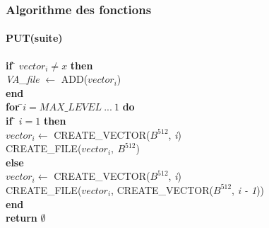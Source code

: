 \documentclass[hyperref={pdfpagemode=FullScreen,colorlinks=true},xcolor=pst,dvips]{beamer}\usepackage[french]{babel}
\begin{document}
	\begin{frame}[shrink]
		\frametitle{Algorithme des fonctions}
		\framesubtitle{PUT(suite)}
		\begin{framed}
		\begin{tabbing}
			\textbf{if }\= $vector_i \neq x$\textbf{ then}\\
				\> \textit{VA\_file } $\leftarrow$ ADD($vector_i$)\\
			\textbf{end}	\\	

			\textbf{for }\=$i = MAX\_LEVEL\ ...\ 1$ \textbf{do}\\
					\> \textbf{if }\= $i = 1$ \textbf{then}\\
					\> 	\> $vector_i \leftarrow$ CREATE\_VECTOR($B^{512}$, \textit{i})\\
					\>	\> CREATE\_FILE($vector_i,\ B^{512}$)\\
					\> \textbf{else}\\
					\>	\> $vector_i \leftarrow$ CREATE\_VECTOR($B^{512}$, \textit{i})\\
					\>	\> CREATE\_FILE($vector_i$, CREATE\_VECTOR($B^{512}$, \textit{i - 1}))\\
			\textbf{end}	\\	
			\textbf{return} $\emptyset$\\
		\end{tabbing}
		\end{framed}
	\end{frame}
	
\end{document}
